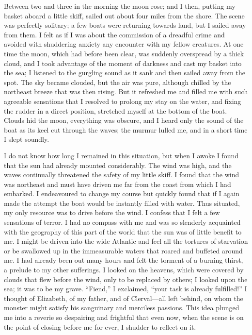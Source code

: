 \documentclass[12pt,openright]{book}
\begin{document}
Between two and three in the morning the moon rose; and I then, putting my basket aboard a little skiff, sailed out about four miles from the shore. The scene was perfectly solitary; a few boats were returning towards land, but I sailed away from them. I felt as if I was about the commission of a dreadful crime and avoided with shuddering anxiety any encounter with my fellow creatures. At one time the moon, which had before been clear, was suddenly overspread by a thick cloud, and I took advantage of the moment of darkness and cast my basket into the sea; I listened to the gurgling sound as it sank and then sailed away from the spot. The sky became clouded, but the air was pure, although chilled by the northeast breeze that was then rising. But it refreshed me and filled me with such agreeable sensations that I resolved to prolong my stay on the water, and fixing the rudder in a direct position, stretched myself at the bottom of the boat. Clouds hid the moon, everything was obscure, and I heard only the sound of the boat as its keel cut through the waves; the murmur lulled me, and in a short time I slept soundly.

I do not know how long I remained in this situation, but when I awoke I found that the sun had already mounted considerably. The wind was high, and the waves continually threatened the safety of my little skiff. I found that the wind was northeast and must have driven me far from the coast from which I had embarked. I endeavoured to change my course but quickly found that if I again made the attempt the boat would be instantly filled with water. Thus situated, my only resource was to drive before the wind. I confess that I felt a few sensations of terror. I had no compass with me and was so slenderly acquainted with the geography of this part of the world that the sun was of little benefit to me. I might be driven into the wide Atlantic and feel all the tortures of starvation or be swallowed up in the immeasurable waters that roared and buffeted around me. I had already been out many hours and felt the torment of a burning thirst, a prelude to my other sufferings. I looked on the heavens, which were covered by clouds that flew before the wind, only to be replaced by others; I looked upon the sea; it was to be my grave. “Fiend,” I exclaimed, “your task is already fulfilled!” I thought of Elizabeth, of my father, and of Clerval—all left behind, on whom the monster might satisfy his sanguinary and merciless passions. This idea plunged me into a reverie so despairing and frightful that even now, when the scene is on the point of closing before me for ever, I shudder to reflect on it.
\end{document}
